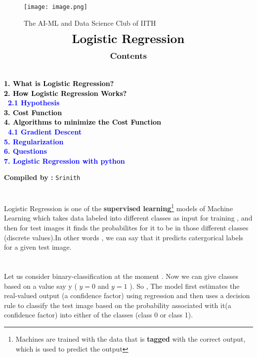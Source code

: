 \documentclass[12pt,a4paper]{article}
\begin{document}
\begin{center}
\begin{figure}[h]
\centering
\texttt{[image: image.png]}
\caption{{{\selectfont The AI-ML and Data Science Club of IITH}}}
\end{figure}
\end{center}
\begin{align*}
{\LARGE{\textbf{Logistic Regression}}}
\end{align*}
\graphicspath{{./media/}}
\begin{align*}
\large{\textbf{{Contents}}}
\end{align*}
{\textcolor{black}{\textbf{
 \\
 1. {What is Logistic Regression?}\\
 2. {How Logistic Regression Works?}\\
\indent \    \textcolor{blue}{2.1 Hypothesis}\\
 3. {Cost Function}\\
 4. {Algorithms to minimize the Cost Function}\\
 \textcolor{blue}{\indent \    4.1 Gradient Descent\\
5. {Regularization}\\
 6. {Questions}\\
7. {Logistic Regression with python}\\
}}}
\begin{center}
    {\textbf{Compiled by :}
    \texttt{Srinith}}
\end{center}

\newpage
\section{}
Logistic Regression is one of the \textbf{supervised learning}\footnote{Machines are trained with the data that is \textbf{tagged} with the correct output, which is used to predict the output} models of Machine Learning which takes data labeled into different classes as input for training , and then for test images it finds the probabilites for it to be in those different classes (discrete values).In other words , we can say that it predicts catergorical labels for a given test image.


\section{}
Let us consider binary-classification at the moment . Now we can give classes based on a value say y ( $y=0$ and $y=1$ ).
So , The model first estimates the real-valued output (a confidence factor) using regression and then uses a decision rule to classify the test image based on the probability associated with it(a confidence factor) into either of the classes (class 0 or class 1).\\ 

}
\end{document}
